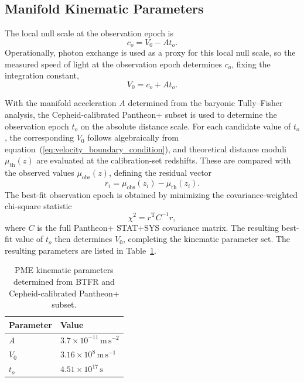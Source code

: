 \documentclass[fontsize=12pt, paper=a4]{scrartcl}
\begin{document}
\subsection{Manifold Kinematic Parameters}

The local null scale at the observation epoch is
\begin{equation}
c_o = V_0 - A t_o .
\label{eq:co_definition}
\end{equation}
Operationally, photon exchange is used as a proxy for this local null scale, so the measured speed of light at the observation epoch determines $c_o$, fixing the integration constant,
\begin{equation}
V_0 = c_o + A t_o .
\label{eq:velocity_boundary_condition}
\end{equation}

With the manifold acceleration $A$ determined from the baryonic Tully--Fisher analysis, the Cepheid-calibrated Pantheon+ subset is used to determine the observation epoch $t_o$ on the absolute distance scale. For each candidate value of $t_o$, the corresponding $V_0$ follows algebraically from equation~(\ref{eq:velocity_boundary_condition}), and theoretical distance moduli $\mu_{\mathrm{th}}(z)$ are evaluated at the calibration-set redshifts. These are compared with the observed values $\mu_{\mathrm{obs}}(z)$, defining the residual vector
\begin{equation}
r_i = \mu_{\mathrm{obs}}(z_i) - \mu_{\mathrm{th}}(z_i).
\end{equation}
The best-fit observation epoch is obtained by minimizing the covariance-weighted chi-square statistic
\begin{equation}
\chi^2 = r^{\mathrm T} C^{-1} r,
\end{equation}
where $C$ is the full Pantheon+ STAT+SYS covariance matrix. The resulting best-fit value of $t_o$ then determines $V_0$, completing the kinematic parameter set. The resulting parameters are listed in Table~\ref{tab:pme_parameters}.

\begin{table}
\centering
\begin{tabular}{|l|l|}
\hline
Parameter & Value \\
\hline
$A$ & $3.7\times10^{-11}\,\mathrm{m\,s^{-2}}$ \\
$V_0$ & $3.16\times10^{8}\,\mathrm{m\,s^{-1}}$ \\
$t_o$ & $4.51\times10^{17}\,\mathrm{s}$ \\
\hline
\end{tabular}
\caption{PME kinematic parameters determined from BTFR and Cepheid-calibrated Pantheon+ subset.}
\label{tab:pme_parameters}
\end{table}
\end{document}
